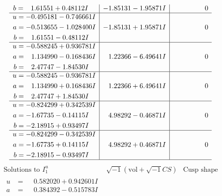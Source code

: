 \documentclass[1p]{elsarticle_modified}
\theoremstyle{definition}
\newcommand{\I}{\sqrt{-1}}
\begin{document}
$$\begin{array}{c|c|c}
\begin{aligned}
b &= \phantom{-}1.61551 + 0.48112 I\end{aligned}
 & -1.85131 - 1.95871 I & \phantom{-0.000000 } 0 \\ \hline\begin{aligned}
u &= -0.495181 - 0.746661 I \\
a &= -0.513655 - 1.028400 I \\
b &= \phantom{-}1.61551 - 0.48112 I\end{aligned}
 & -1.85131 + 1.95871 I & \phantom{-0.000000 } 0 \\ \hline\begin{aligned}
u &= -0.588245 + 0.936781 I \\
a &= \phantom{-}1.134990 - 0.168436 I \\
b &= \phantom{-}2.47747 - 1.84530 I\end{aligned}
 & \phantom{-}1.22366 - 6.49641 I & \phantom{-0.000000 } 0 \\ \hline\begin{aligned}
u &= -0.588245 - 0.936781 I \\
a &= \phantom{-}1.134990 + 0.168436 I \\
b &= \phantom{-}2.47747 + 1.84530 I\end{aligned}
 & \phantom{-}1.22366 + 6.49641 I & \phantom{-0.000000 } 0 \\ \hline\begin{aligned}
u &= -0.824299 + 0.342539 I \\
a &= -1.67735 - 0.14115 I \\
b &= -2.18915 + 0.93497 I\end{aligned}
 & \phantom{-}4.98292 - 0.46871 I & \phantom{-0.000000 } 0 \\ \hline\begin{aligned}
u &= -0.824299 - 0.342539 I \\
a &= -1.67735 + 0.14115 I \\
b &= -2.18915 - 0.93497 I\end{aligned}
 & \phantom{-}4.98292 + 0.46871 I & \phantom{-0.000000 } 0\\
 \hline 
 \end{array}$$\newpage$$\begin{array}{c|c|c}  
\text{Solutions to }I^u_{1}& \I (\text{vol} + \sqrt{-1}CS) & \text{Cusp shape}\\
 \hline 
\begin{aligned}
u &= \phantom{-}0.582020 + 0.942601 I \\
a &= \phantom{-}0.384392 - 0.515783 I \\

\end{aligned}
\end{array}$$
\end{document}
